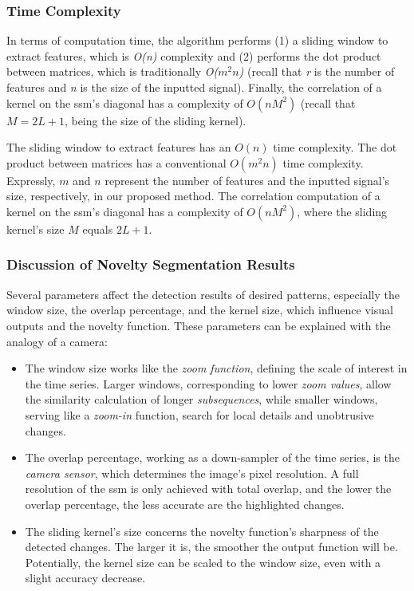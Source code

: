 \subsubsection{Time Complexity}
\label{sec:time_complexity}

In terms of computation time, the algorithm performs (1) a sliding window to extract features, which is \textit{O(n)} complexity and (2) performs the dot product between matrices, which is traditionally \textit{O($m^2n$)} (recall that \textit{r} is the number of features and \textit{n} is the size of the inputted signal). Finally, the correlation of a kernel on the \gls{ssm}'s diagonal has a complexity of $O(nM^2)$ (recall that $M=2L+1$, being the size of the sliding kernel).

The sliding window to extract features has an $O(n)$ time complexity. The dot product between matrices has a conventional $O(m^2n)$ time complexity. Expressly, $m$ and $n$ represent the number of features and the inputted signal's size, respectively, in our proposed method. The correlation computation of a kernel on the \gls{ssm}'s diagonal has a complexity of $O(nM^2)$, where the sliding kernel's size $M$ equals $2L+1$.

\subsubsection{Discussion of Novelty Segmentation Results}
\label{sec:novelty_seg_discussion}

Several parameters affect the detection results of desired patterns, especially the window size, the overlap percentage, and the kernel size, which influence visual outputs and the novelty function. These parameters can be explained with the analogy of a camera:

\begin{itemize}
    \item The window size works like the \textit{zoom function}, defining the scale of interest in the time series. Larger windows, corresponding to lower \textit{zoom values}, allow the similarity calculation of longer \textit{subsequences}, while smaller windows, serving like a \textit{zoom-in} function, search for local details and unobtrusive changes.
    \item The overlap percentage, working as a down-sampler of the time series, is the \textit{camera sensor}, which determines the image's pixel resolution. A full resolution of the \gls{ssm} is only achieved with total overlap, and the lower the overlap percentage, the less accurate are the highlighted changes.
    \item The sliding kernel's size concerns the novelty function's sharpness of the detected changes. The larger it is, the smoother the output function will be. Potentially, the kernel size can be scaled to the window size, even with a slight accuracy decrease.
\end{itemize}

